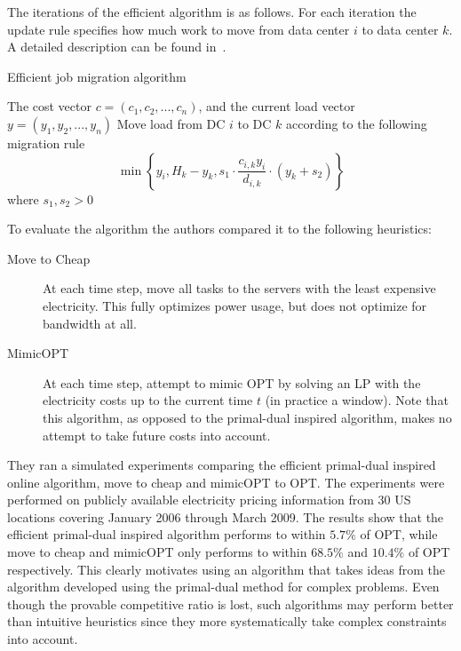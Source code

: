 The iterations of the efficient algorithm is as follows. For each iteration the update rule specifies how much work to move from data center $i$ to data center $k$. A detailed description can be found in~\cite{buchbinder11:job-migration-techreport}.

\begin{algorithm}
\caption{Efficient job migration algorithm}
\label{job-migration-alg-efficient}
\begin{algorithmic}[1]
\REQUIRE The cost vector $c=(c_1,c_2,...,c_n)$, and the current load vector $y=(y_1,y_2,...,y_n)$
  \STATE Move load from DC $i$ to DC $k$ according to the following migration rule 
   \[ 
    \min \left\{ y_i, H_k - y_{k}, s_1 \cdot \frac{c_{i,k}y_i}{d_{i,k}} \cdot (y_k + s_2) \right\}
   \]
   where $s_1,s_2 > 0$
 \ENDFOR
\ENDFOR
\end{algorithmic}
\end{algorithm}

To evaluate the algorithm the authors compared it to the following heuristics:
\begin{description}
 \item[Move to Cheap] At each time step, move all tasks to the servers with the least expensive electricity. This fully optimizes power usage, but does not optimize for bandwidth at all.
 \item[MimicOPT] At each time step, attempt to mimic OPT by solving an LP with the electricity costs up to the current time $t$ (in practice a window). Note that this algorithm, as opposed to the primal-dual inspired algorithm, makes no attempt to take future costs into account.
\end{description}

They ran a simulated experiments comparing the efficient primal-dual inspired online algorithm, move to cheap and mimicOPT to OPT.
The experiments were performed on publicly available electricity pricing information from 30 US locations covering January 2006 through March 2009.
The results show that the efficient primal-dual inspired algorithm  performs to within $5.7\%$ of OPT, while move to cheap and mimicOPT only performs to within $68.5\%$ and $10.4\%$ of OPT respectively.
This clearly motivates using an algorithm that takes ideas from the algorithm developed using the primal-dual method for complex problems. 
Even though the provable competitive ratio is lost, such algorithms may perform better than intuitive heuristics since they more systematically take complex constraints into account.
